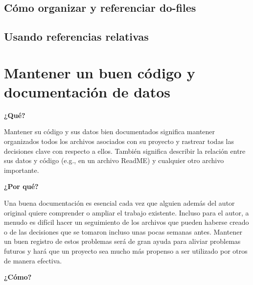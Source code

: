 \documentclass[11pt,en]{elegantpaper}
\begin{document}
\subsection{Cómo organizar y referenciar do-files}
\label{sec:doorganizar}

\subsection{Usando referencias relativas}
\label{sec:refrelativas}

\newpage 
\section{Mantener un buen código y documentación de datos}
\label{sec:documentacion}

\textbf{¿Qué?}

Mantener su código y sus datos bien documentados significa mantener organizados todos los archivos asociados con su proyecto y rastrear todas las decisiones clave con respecto a ellos. También significa describir la relación entre sus datos y código (e.g., en un archivo ReadME) y cualquier otro archivo importante.

\textbf{¿Por qué?}

Una buena documentación es esencial cada vez que alguien además del autor original quiere comprender o ampliar el trabajo existente. Incluso para el autor, a menudo es difícil hacer un seguimiento de los archivos que pueden haberse creado o de las decisiones que se tomaron incluso unas pocas semanas antes. Mantener un buen registro de estos problemas será de gran ayuda para aliviar problemas futuros y hará que un proyecto sea mucho más propenso a ser utilizado por otros de manera efectiva.

\textbf{¿Cómo?}
\end{document}
